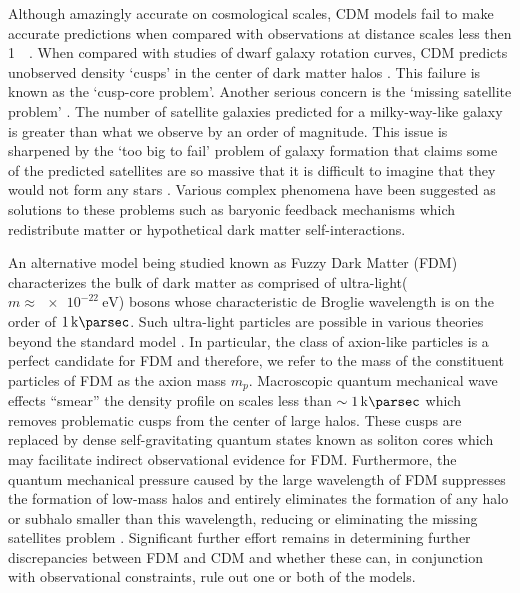 \documentclass[usenatbib]{mnras}
\newcommand{\squote}[1]{\lq #1\rq}
\newcommand{\poweV}[1]{\SI{e#1}{\electronvolt}}
\begin{document}
\par

Although amazingly accurate on cosmological scales, CDM models fail to make accurate predictions when compared with observations at distance scales less then \SI{1}{\kilo\parsec}. When compared with studies of dwarf galaxy rotation curves, CDM predicts unobserved density \squote{cusps} in the center of dark matter halos \citep{ultralight}. This failure is known as the \squote{cusp-core problem}. Another serious concern is the \squote{missing satellite problem}  \citep{missing_satellites}. The number of satellite galaxies predicted for a milky-way-like galaxy is greater than what we observe by an order of magnitude. This issue is sharpened by the \squote{too big to fail} problem of galaxy formation that claims some of the predicted satellites are so massive that it is difficult to imagine that they would not form any stars \citep{too_big_to_fail}. Various complex phenomena have been suggested as solutions to these problems such as baryonic feedback mechanisms which redistribute matter or  hypothetical dark matter self-interactions.

\par

An alternative model being studied known as Fuzzy Dark Matter (FDM) characterizes the bulk of dark matter as comprised of ultra-light($m \approx \poweV{-22}$) bosons whose characteristic de Broglie wavelength is on the order of $\SI{1}{\kilo\parsec}$. Such ultra-light particles are possible in various theories beyond the standard model \citep{axion_cosmology}. In particular, the class of axion-like particles is a perfect candidate for FDM and therefore, we refer to the mass of the constituent particles of FDM as the axion mass $m_p$. Macroscopic quantum mechanical wave effects “smear” the density profile on scales less than $\sim \SI{1}{\kilo\parsec}$ which removes problematic cusps from the center of large halos. These cusps are replaced by dense self-gravitating quantum states known as soliton cores which may facilitate indirect observational evidence for FDM. Furthermore, the quantum mechanical pressure caused by the large wavelength of FDM suppresses the formation of low-mass halos and entirely eliminates the formation of any halo or subhalo smaller than this wavelength, reducing or eliminating the missing satellites problem \citep{substructure_FDM}. Significant further effort remains in determining further discrepancies between FDM and CDM and whether these can, in conjunction with observational constraints, rule out one or both of the models.
 
\end{document}
